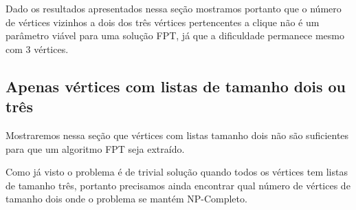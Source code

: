 Dado os resultados apresentados nessa seção mostramos portanto que o número de vértices vizinhos a dois dos três vértices pertencentes a clique não é um parâmetro viável para uma solução FPT, já que a dificuldade permanece mesmo com 3 vértices.
  
\subsection{Apenas vértices com listas de tamanho dois ou três}

Mostraremos nessa seção que vértices com listas tamanho dois não são suficientes para que um algoritmo FPT seja extraído.

Como já visto o problema é de trivial solução quando todos os vértices tem listas de tamanho três, portanto precisamos ainda encontrar qual número de vértices de tamanho dois onde o problema se mantém NP-Completo.

